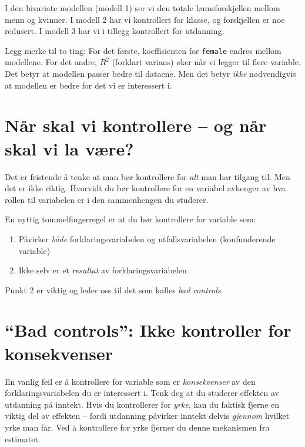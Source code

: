 \documentclass[
  norsk,
  letterpaper,
  DIV=11,
  numbers=noendperiod]{scrreprt}
\providecommand{\tightlist}{%
  \setlength{\itemsep}{0pt}\setlength{\parskip}{0pt}}
\theoremstyle{definition}
\theoremstyle{remark}
\begin{document}
I den bivariate modellen (modell 1) ser vi den totale lønnsforskjellen
mellom menn og kvinner. I modell 2 har vi kontrollert for klasse, og
forskjellen er noe redusert. I modell 3 har vi i tillegg kontrollert for
utdanning.

Legg merke til to ting: For det første, koeffisienten for
\texttt{female} endres mellom modellene. For det andre, \(R^2\)
(forklart varians) øker når vi legger til flere variable. Det betyr at
modellen passer bedre til dataene. Men det betyr \emph{ikke}
nødvendigvis at modellen er bedre for det vi er interessert i.

\section{Når skal vi kontrollere -- og når skal vi la
være?}\label{nuxe5r-skal-vi-kontrollere-og-nuxe5r-skal-vi-la-vuxe6re}

Det er fristende å tenke at man bør kontrollere for \emph{alt} man har
tilgang til. Men det er ikke riktig. Hvorvidt du bør kontrollere for en
variabel avhenger av hva rollen til variabelen er i den sammenhengen du
studerer.

En nyttig tommelfingerregel er at du bør kontrollere for variable som:

\begin{enumerate}
\def\labelenumi{\arabic{enumi}.}
\tightlist
\item
  Påvirker \emph{både} forklaringsvariabelen og utfallsvariabelen
  (konfunderende variable)
\item
  Ikke selv er et \emph{resultat} av forklaringsvariabelen
\end{enumerate}

Punkt 2 er viktig og leder oss til det som kalles \emph{bad controls}.

\section{``Bad controls'': Ikke kontroller for
konsekvenser}\label{bad-controls-ikke-kontroller-for-konsekvenser}

En vanlig feil er å kontrollere for variable som er \emph{konsekvenser}
av den forklaringsvariabelen du er interessert i. Tenk deg at du
studerer effekten av utdanning på inntekt. Hvis du kontrollerer for
\emph{yrke}, kan du faktisk fjerne en viktig del av effekten -- fordi
utdanning påvirker inntekt delvis \emph{gjennom} hvilket yrke man får.
Ved å kontrollere for yrke fjerner du denne mekanismen fra estimatet.
\end{document}
